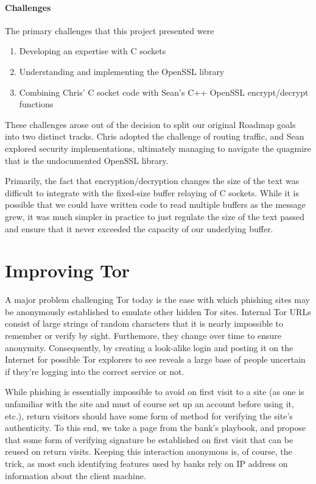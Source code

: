 \documentclass[12pt]{article}
\begin{document}
\paragraph{Challenges}
The primary challenges that this project presented were
\begin{enumerate}
\item Developing an expertise with C sockets
\item Understanding and implementing the OpenSSL library
\item Combining Chris' C socket code with Sean's C++ OpenSSL encrypt/decrypt functions
\end{enumerate}
These challenges arose out of the decision to split our original Roadmap goals into two distinct tracks. Chris adopted the challenge of routing traffic, and Sean explored security implementations, ultimately managing to navigate the quagmire that is the undocumented OpenSSL library.

Primarily, the fact that encryption/decryption changes the size of the text was difficult to integrate with the fixed-size buffer relaying of C sockets. While it is possible that we could have written code to read multiple buffers as the message grew, it was much simpler in practice to just regulate the size of the text passed and ensure that it never exceeded the capacity of our underlying buffer.

\section{Improving Tor}
A major problem challenging Tor today is the ease with which phishing sites may be anonymously established to emulate other hidden Tor sites. Internal Tor URLs consist of large strings of random characters that it is nearly impossible to remember or verify by sight. Furthemore, they change over time to ensure anonymity. Consequently, by creating a look-alike login and posting it on the Internet for possible Tor explorers to see reveals a large base of people uncertain if they're logging into the correct service or not.

While phishing is essentially impossible to avoid on first visit to a site (as one is unfamiliar with the site and must of course set up an account before using it, etc.), return visitors should have some form of method for verifying the site's authenticity. To this end, we take a page from the bank's playbook, and propose that some form of verifying signature be established on first visit that can be reused on return visits. Keeping this interaction anonymous is, of course, the trick, as most such identifying features used by banks rely on IP address on information about the client machine.
\end{document}
